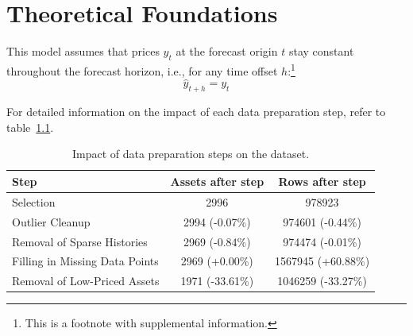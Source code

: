 \chapter{Theoretical Foundations}
\label{ch:theoretical-foundations}

This model assumes that prices $y_t$ at the forecast origin $t$ stay constant throughout the forecast horizon, i.e., for any time offset $h$:\footnote{This is a footnote with supplemental information.}
\[
{\widehat{y}}_{t+h}=y_{t}
\]

For detailed information on the impact of each data preparation step, refer to table~\ref{tab:data-preparation-summary}.
\begin{table}[H]
    \centering
    \begin{tabular}{lcc}
        \toprule
        Step & Assets after step & Rows after step \\
        \midrule
        Selection & \num{2996} & \num{978923} \\
        Outlier Cleanup & \num{2994} (-0.07\%) & \num{974601} (-0.44\%) \\
        Removal of Sparse Histories & \num{2969} (-0.84\%) & \num{974474} (-0.01\%) \\
        Filling in Missing Data Points & \num{2969} (+0.00\%) & \num{1567945} (+60.88\%) \\
        Removal of Low-Priced Assets & \num{1971} (-33.61\%) & \num{1046259} (-33.27\%) \\
        \bottomrule
    \end{tabular}
    \caption{Impact of data preparation steps on the dataset.}
    \label{tab:data-preparation-summary}
\end{table}
